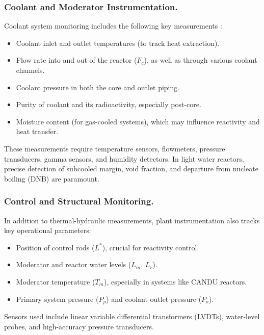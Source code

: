 \documentclass[12pt]{article}
\begin{document}
\subsubsection{Coolant and Moderator Instrumentation.}
Coolant system monitoring includes the following key measurements \cite{ichandbook}:
\begin{itemize}
  \item Coolant inlet and outlet temperatures (to track heat extraction).
  \item Flow rate into and out of the reactor ($F_c$), as well as through various coolant channels.
  \item Coolant pressure in both the core and outlet piping.
  \item Purity of coolant and its radioactivity, especially post-core.
  \item Moisture content (for gas-cooled systems), which may influence reactivity and heat transfer.
\end{itemize}
These measurements require temperature sensors, flowmeters, pressure transducers, gamma sensors, and humidity detectors. In light water reactors, precise detection of subcooled margin, void fraction, and departure from nucleate boiling (DNB) are paramount.

\subsubsection{Control and Structural Monitoring.}
In addition to thermal-hydraulic measurements, plant instrumentation also tracks key operational parameters:
\begin{itemize}
  \item Position of control rods ($L^*$), crucial for reactivity control.
  \item Moderator and reactor water levels ($L_m$, $L_r$).
  \item Moderator temperature ($T_m$), especially in systems like CANDU reactors.
  \item Primary system pressure ($P_p$) and coolant outlet pressure ($P_o$).
\end{itemize}
Sensors used include linear variable differential transformers (LVDTs), water-level probes, and high-accuracy pressure transducers.
\end{document}
